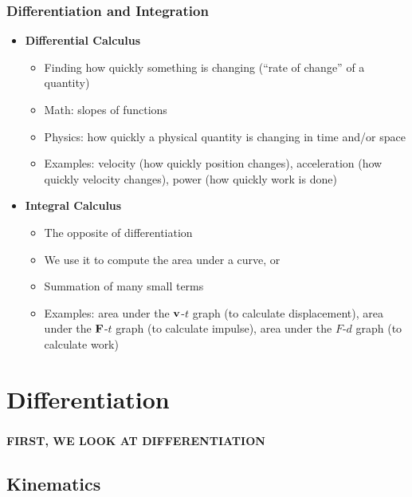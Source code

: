 \documentclass[12pt,compress,aspectratio=169]{beamer}
\newcommand{\mb}[1]{\ensuremath\mathbf{#1}}
\begin{document}
\begin{frame}
  \frametitle{Differentiation and Integration}
  \begin{itemize}
  \item\textbf{Differential Calculus}
    \begin{itemize}
    \item Finding how quickly something is changing (``rate of change'' of a
      quantity)
    \item Math: slopes of functions
    \item Physics: how quickly a physical quantity is changing in time and/or
      space
    \item Examples: velocity (how quickly position changes), acceleration
      (how quickly velocity changes), power (how quickly work is done)
    \end{itemize}
  \item\textbf{Integral Calculus}
    \begin{itemize}
    \item The opposite of differentiation
    \item We use it to compute the area under a curve, or
    \item Summation of many small terms
    \item Examples: area under the $\mb{v}$-$t$ graph (to calculate
      displacement), area under the $\mb{F}$-$t$ graph (to calculate impulse),
      area under the $F$-$d$ graph (to calculate work)
    \end{itemize}
  \end{itemize}
\end{frame}


\section{Differentiation}

\begin{frame}
  \frametitle{}
  \begin{center}
    {\Large\textbf{FIRST, WE LOOK AT DIFFERENTIATION}
    }
  \end{center}
\end{frame}

\subsection{Kinematics}
\end{document}

